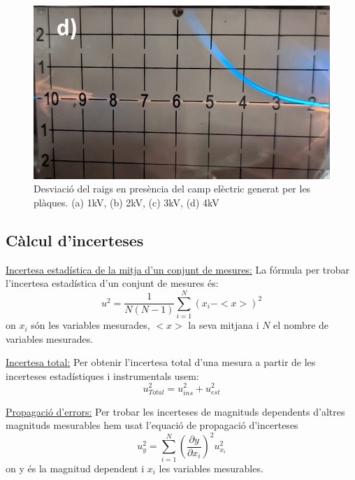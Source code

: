 \documentclass[11pt]{article}
\numberwithin{equation}{section}
\numberwithin{figure}{section}
\numberwithin{table}{section}
\begin{document}
\begin{figure}[H]
\begin{minipage}{0.38\textwidth}
    \end{minipage}
    \begin{minipage}{0.38\textwidth}
        \centering
        \includegraphics[width=\textwidth]{4kV.jpg}
    \end{minipage}
    \caption{Desviació del raigs en presència del camp elèctric generat per les plàques. (a) 1kV, (b) 2kV, (c) 3kV, (d) 4kV}
    \label{fig: Desv E}
\end{figure}
\subsection{Càlcul d'incerteses}
\underline{Incertesa estadística de la mitja d'un conjunt de mesures:} La fórmula per trobar l'incertesa estadística d'un conjunt de mesures és:
\begin{equation} \label{eq: incertesa estadística}
    u^2 = \frac{1}{N(N-1)} \sum_{i=1}^{N} (x_i - <x>)^2
\end{equation}
on ${x_i}$ són les variables mesurades, $<x>$ la seva mitjana i $N$ el nombre de variables mesurades.

\underline{Incertesa total:} Per obtenir l'incertesa total d'una mesura a partir de les incerteses estadístiques i instrumentals usem:
\begin{equation} \label{eq: incertesa total}
    u_{Total}^2 = u_{ins}^2+u_{est}^2
\end{equation}

\underline{Propagació d'errors:}  Per trobar les incerteses de magnituds dependents d'altres magnituds mesurables hem usat l'equació de propagació d'incerteses
\begin{equation} \label{eq: propagació d'errors}
    u_{y}^2=\sum_{i=1}^{N}(\frac{\partial y}{\partial x_i})^2u_{x_i}^2
\end{equation}
on y és la magnitud dependent i ${x_i}$ les variables mesurables.
\end{document}
